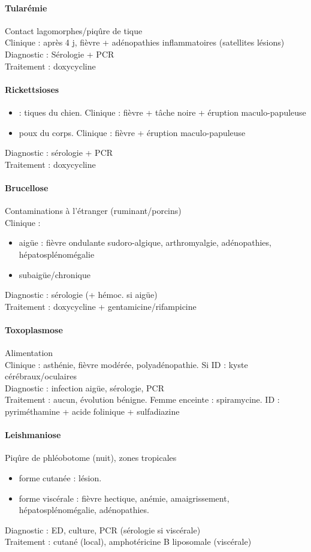 \documentclass{article}
\begin{document}
\paragraph{Tularémie} Contact lagomorphes/piqûre de tique\\
Clinique : après 4 j, fièvre + adénopathies inflammatoires (satellites lésions)
Diagnostic : Sérologie + PCR\\
Traitement : doxycycline


\paragraph{Rickettsioses} 
\begin{itemize}
  \item {} : tiques du chien. Clinique : fièvre + tâche noire +
    éruption maculo-papuleuse
  \item {} poux du corps. Clinique : fièvre + éruption
    maculo-papuleuse
\end{itemize}
Diagnostic : sérologie + PCR\\
Traitement : doxycycline

\paragraph{Brucellose} Contaminations à l'étranger (ruminant/porcins)\\
Clinique :
\begin{itemize}
  \item aigüe : fièvre ondulante sudoro-algique, arthromyalgie, adénopathies,
    hépatosplénomégalie
  \item subaigüe/chronique
\end{itemize}
Diagnostic : sérologie (+ hémoc. si aigüe)\\
Traitement : doxycycline + gentamicine/rifampicine

\paragraph{Toxoplasmose} Alimentation\\
Clinique : asthénie, fièvre modérée, polyadénopathie. Si ID : kyste
cérébraux/oculaires\\
Diagnostic : infection aigüe, sérologie, PCR\\
Traitement : aucun, évolution bénigne. Femme enceinte : spiramycine. ID :
pyriméthamine + acide folinique + sulfadiazine

\paragraph{Leishmaniose} Piqûre de phléobotome (nuit), zones tropicales
\begin{itemize}
  \item forme cutanée : lésion. 
  \item forme viscérale : fièvre hectique, anémie, amaigrissement,
    hépatosplénomégalie, adénopathies.
\end{itemize}
Diagnostic : ED, culture, PCR (sérologie si viscérale)\\
Traitement : cutané (local), amphotéricine B liposomale (viscérale)
\end{document}
